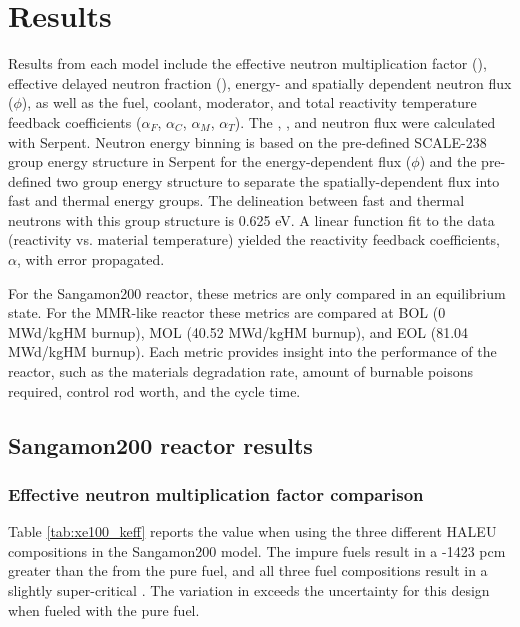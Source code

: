 \section{Results}
Results from each model include the effective neutron 
multiplication factor (\keff), effective delayed 
neutron fraction (\betaEff), energy- and spatially dependent 
neutron flux ($\phi$), as well as the fuel, coolant, moderator, and total reactivity 
temperature feedback coefficients ($\alpha_F$, $\alpha_C$, 
$\alpha_M$, $\alpha_T$). The
\keff, \betaEff, and neutron flux were calculated with Serpent. 
Neutron energy binning is based on the  pre-defined SCALE-238 
group energy structure in 
Serpent for the energy-dependent flux ($\phi$) and the pre-defined 
two group energy structure to separate the 
spatially-dependent flux into fast and thermal energy groups. The delineation between fast 
and thermal neutrons with this group structure is 0.625 eV.
A linear function fit to the
data (reactivity vs. material temperature) yielded the 
reactivity feedback coefficients, $\alpha$, with error 
propagated.

For the Sangamon200 reactor, these metrics are only compared in an 
equilibrium state. For the \gls*{MMR}-like reactor these metrics 
are compared at \gls*{BOL} (0 MWd/kgHM burnup), \gls*{MOL} (40.52 MWd/kgHM burnup), 
and \gls*{EOL} (81.04 MWd/kgHM burnup). Each metric provides  
insight into the performance of 
the reactor, such as the materials degradation rate, amount of burnable 
poisons required, control rod worth, and the cycle time. 

\subsection{Sangamon200 reactor results}

\subsubsection{Effective neutron multiplication factor comparison}
Table \ref{tab:xe100_keff} reports the \keff value when using the 
three different \gls*{HALEU} compositions in the Sangamon200 model. 
The impure fuels result in a -1423 pcm 
greater than the \keff from the pure fuel, and all three fuel compositions 
result in a slightly super-critical \keff. The variation in 
\keff exceeds the uncertainty for this design when fueled with 
the pure fuel. 


